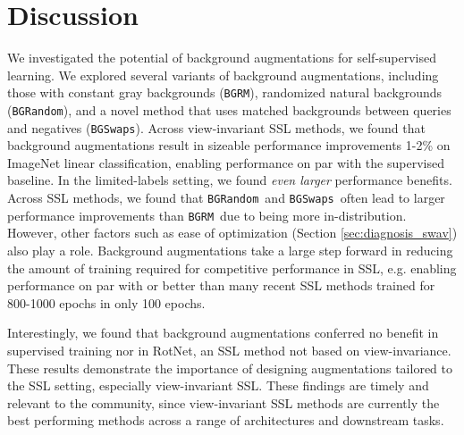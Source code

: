 \documentclass[twoside,11pt]{article}
\newcommand{\bgrm}{\texttt{BG\textunderscore RM}}
\newcommand{\bgswaps}{\texttt{BG\textunderscore Swaps}}
\newcommand{\bgrand}{\texttt{BG\textunderscore Random}}
\begin{document}
 
\section{Discussion} \label{sec:discussion}

We investigated the potential of background augmentations for self-supervised learning. We explored several variants of background augmentations, including those with constant gray backgrounds (\bgrm), randomized natural backgrounds (\bgrand), and a novel method that uses matched backgrounds between queries and negatives (\bgswaps). Across view-invariant SSL methods, we found that background augmentations result in sizeable performance improvements 1-2\% on ImageNet linear classification, enabling performance on par with the supervised baseline. In the limited-labels setting, we found \textit{even larger} performance benefits. Across SSL methods, we found that \bgrand~and \bgswaps~often lead to larger performance improvements than \bgrm~due to being more in-distribution. However, other factors such as ease of optimization (Section \ref{sec:diagnosis_swav}) also play a role. Background augmentations take a large step forward in reducing the amount of training required for competitive performance in SSL, e.g. enabling performance on par with or better than many recent SSL methods trained for 800-1000 epochs in only 100 epochs.


Interestingly, we found that background augmentations conferred no benefit in supervised training nor in RotNet, an SSL method not based on view-invariance. These results demonstrate the importance of designing augmentations tailored to the SSL setting, especially view-invariant SSL. These findings are timely and relevant to the community, since view-invariant SSL methods are currently the best performing methods across a range of architectures and downstream tasks.
\end{document}

